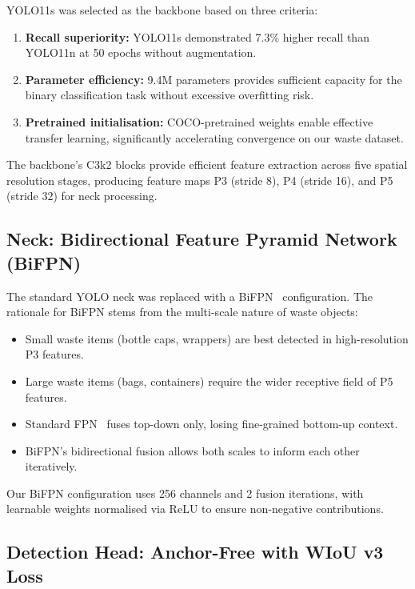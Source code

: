 YOLO11s was selected as the backbone based on three criteria:
\begin{enumerate}
    \item \textbf{Recall superiority:} YOLO11s demonstrated 7.3\% higher recall than YOLO11n at 50 epochs without augmentation.
    \item \textbf{Parameter efficiency:} 9.4M parameters provides sufficient capacity for the binary classification task without excessive overfitting risk.
    \item \textbf{Pretrained initialisation:} COCO-pretrained weights enable effective transfer learning, significantly accelerating convergence on our waste dataset.
\end{enumerate}

The backbone's C3k2 blocks provide efficient feature extraction across five spatial resolution stages, producing feature maps P3 (stride 8), P4 (stride 16), and P5 (stride 32) for neck processing.

\subsection{Neck: Bidirectional Feature Pyramid Network (BiFPN)}

The standard YOLO neck was replaced with a BiFPN~\cite{tan2020efficientdet} configuration. The rationale for BiFPN stems from the multi-scale nature of waste objects:
\begin{itemize}
    \item Small waste items (bottle caps, wrappers) are best detected in high-resolution P3 features.
    \item Large waste items (bags, containers) require the wider receptive field of P5 features.
    \item Standard FPN~\cite{lin2017fpn} fuses top-down only, losing fine-grained bottom-up context.
    \item BiFPN's bidirectional fusion allows both scales to inform each other iteratively.
\end{itemize}

Our BiFPN configuration uses 256 channels and 2 fusion iterations, with learnable weights normalised via ReLU to ensure non-negative contributions.

\subsection{Detection Head: Anchor-Free with WIoU v3 Loss}

